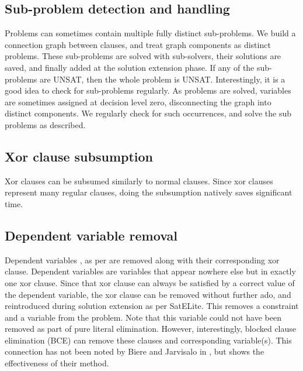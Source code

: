 \documentclass[final]{ieee}
\begin{document}
\subsection{Sub-problem detection and handling}
Problems can sometimes contain multiple fully distinct sub-problems. We build a connection graph between clauses, and treat graph components as distinct problems. These sub-problems are solved with sub-solvers, their solutions are saved, and finally added at the solution extension phase. If any of the sub-problems are UNSAT, then the whole problem is UNSAT. Interestingly, it is a good idea to check for sub-problems regularly. As problems are solved, variables are sometimes assigned at decision level zero, disconnecting the graph into distinct components. We regularly check for such occurrences, and solve the sub problems as described.

\subsection{Xor clause subsumption}
Xor clauses can be subsumed similarly to normal clauses. Since xor clauses represent many regular clauses, doing the subsumption natively saves significant time.

\subsection{Dependent variable removal}
Dependent variables , as per \cite{Heule-phd} are removed along with their corresponding xor clause. Dependent variables are variables that appear nowhere else but in exactly one xor clause. Since that xor clause can always be satisfied by a correct value of the dependent variable, the xor clause can be removed without further ado, and reintroduced during solution extension as per SatELite. This removes a constraint and a variable from the problem. Note that this variable could not have been removed as part of pure literal elimination. However, interestingly, blocked clause elimination (BCE) can remove these clauses and corresponding variable(s). This connection has not been noted by Biere and Jarvisalo in \cite{DBLP:conf/tacas/JarvisaloBH10}, but shows the effectiveness of their method.
\end{document}
